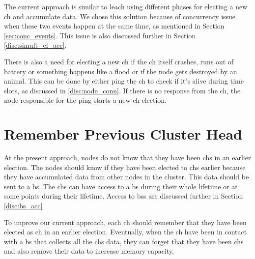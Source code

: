 \documentclass[USenglish]{uit-thesis}
\begin{document}

The current approach is similar to \gls{leach} using different phases for electing a new \gls{ch} and accumulate data. We chose this solution because of concurrency issue when these two events happen at the same time, as mentioned in Section \ref{sec:conc_events}. This issue is also discussed further in Section \ref{disc:simult_el_acc}.

There is also a need for electing a new \gls{ch} if the \gls{ch} itself crashes, runs out of battery or something happens like a flood or if the node gets destroyed by an animal. This can be done by either ping the \gls{ch} to check if it's alive during time slots, as discussed in \autoref{disc:node_conn}. If there is no response from the \gls{ch}, the node responsible for the ping starts a new \gls{ch}-election.





\section{Remember Previous Cluster Head}
At the present approach, nodes do not know that they have been \glspl{ch} in an earlier election. The nodes should know if they have been elected to \glspl{ch} earlier because they have accumulated data from other nodes in the cluster. This data should be sent to a \gls{bs}. The \glspl{ch} can have access to a \gls{bs} during their whole lifetime or at some points during their lifetime. Access to \glspl{bs} are discussed further in Section \ref{disc:bs_acc}

To improve our current approach, each \gls{ch} should remember that they have been elected as \gls{ch} in an earlier election. Eventually, when the \gls{ch} have been in contact with a \gls{bs} that collects all the \glspl{ch} data, they can forget that they have been \glspl{ch} and also remove their data to increase memory capacity.


\end{document}
